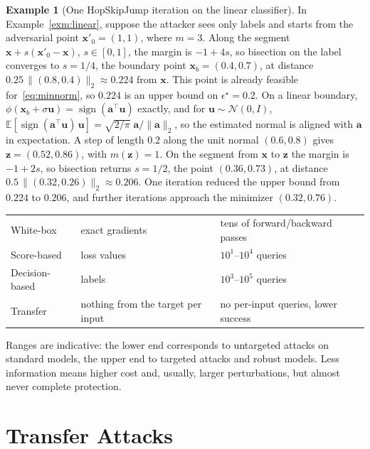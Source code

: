 \documentclass[10pt,a4paper]{extarticle}
\theoremstyle{definition}
\newtheorem{example}{Example}[section]
\newcommand{\x}{\mathbf{x}}
\newcommand{\xadv}{\mathbf{x}'}
\DeclareMathOperator{\sign}{sign}
\begin{document}
\begin{example}[One HopSkipJump iteration on the linear classifier]\label{exm:hsj}
In Example~\ref{exm:linear}, suppose the attacker sees only labels and starts from the adversarial point \(\xadv_0=(1,1)\), where \(m=3\). Along the segment \(\x+s(\xadv_0-\x)\), \(s\in[0,1]\), the margin is \(-1+4s\), so bisection on the label converges to \(s=1/4\), the boundary point \(\x_b=(0.4,0.7)\), at distance \(0.25\,\|(0.8,0.4)\|_2\approx0.224\) from \(\x\). This point is already feasible for~\eqref{eq:minnorm}, so \(0.224\) is an upper bound on \(\epsilon^\star=0.2\). On a linear boundary, \(\phi(\x_b+\sigma\mathbf{u})=\sign(\mathbf{a}^\top\mathbf{u})\) exactly, and for \(\mathbf{u}\sim\mathcal{N}(0,I)\), \(\mathbb{E}[\sign(\mathbf{a}^\top\mathbf{u})\,\mathbf{u}]=\sqrt{2/\pi}\;\mathbf{a}/\|\mathbf{a}\|_2\), so the estimated normal is aligned with \(\mathbf{a}\) in expectation. A step of length \(0.2\) along the unit normal \((0.6,0.8)\) gives \(\mathbf{z}=(0.52,0.86)\), with \(m(\mathbf{z})=1\). On the segment from \(\x\) to \(\mathbf{z}\) the margin is \(-1+2s\), so bisection returns \(s=1/2\), the point \((0.36,0.73)\), at distance \(0.5\,\|(0.32,0.26)\|_2\approx0.206\). One iteration reduced the upper bound from \(0.224\) to \(0.206\), and further iterations approach the minimizer \((0.32,0.76)\).
\end{example}

\begin{keybox}
\begin{tabular}{@{}lll@{}}
White-box & exact gradients & tens of forward/backward passes \\
Score-based & loss values & \(10^1\)--\(10^4\) queries \\
Decision-based & labels & \(10^3\)--\(10^5\) queries \\
Transfer & nothing from the target per input & no per-input queries, lower success \\
\end{tabular}

\smallskip
Ranges are indicative: the lower end corresponds to untargeted attacks on standard models, the upper end to targeted attacks and robust models. Less information means higher cost and, usually, larger perturbations, but almost never complete protection.
\end{keybox}

\section{Transfer Attacks}\label{sec:transfer}
\end{document}
